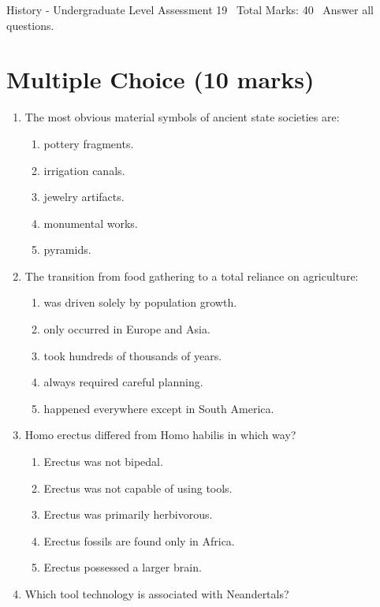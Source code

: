 \documentclass[12pt]{article}
\begin{document}
\begin{center}
History - Undergraduate Level Assessment 19 \
Total Marks: 40 \
Answer all questions.
\end{center}

\section*{Multiple Choice (10 marks)}
\begin{enumerate}[label=\arabic*.]
\item The most obvious material symbols of ancient state societies are:
\begin{enumerate}[label=(\alph*)]
    \item pottery fragments.
    \item irrigation canals.
    \item jewelry artifacts.
    \item monumental works.
    \item pyramids.
\end{enumerate}
\item The transition from food gathering to a total reliance on agriculture:
\begin{enumerate}[label=(\alph*)]
    \item was driven solely by population growth.
    \item only occurred in Europe and Asia.
    \item took hundreds of thousands of years.
    \item always required careful planning.
    \item happened everywhere except in South America.
\end{enumerate}
\item Homo erectus differed from Homo habilis in which way?
\begin{enumerate}[label=(\alph*)]
    \item Erectus was not bipedal.
    \item Erectus was not capable of using tools.
    \item Erectus was primarily herbivorous.
    \item Erectus fossils are found only in Africa.
    \item Erectus possessed a larger brain.
\end{enumerate}
\item Which tool technology is associated with Neandertals?
\begin{enumerate}[label=(\alph*)]

\end{enumerate}
\end{enumerate}
\end{document}
